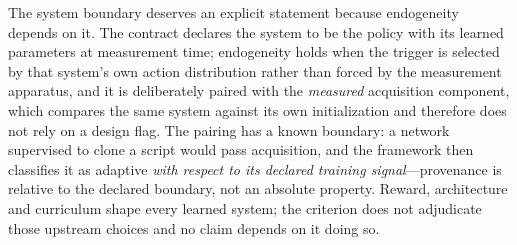 \documentclass[11pt]{article}
\theoremstyle{definition}
\begin{document}
The system boundary deserves an explicit statement because endogeneity
depends on it. The contract declares the system to be the policy with
its learned parameters at measurement time; endogeneity holds when the
trigger is selected by that system's own action distribution rather
than forced by the measurement apparatus, and it is deliberately
paired with the \emph{measured} acquisition component, which compares
the same system against its own initialization and therefore does not
rely on a design flag. The pairing has a known boundary: a network
supervised to clone a script would pass acquisition, and the framework
then classifies it as adaptive \emph{with respect to its declared
training signal}---provenance is relative to the declared boundary,
not an absolute property. Reward, architecture and curriculum shape
every learned system; the criterion does not adjudicate those upstream
choices and no claim depends on it doing so.
\end{document}
